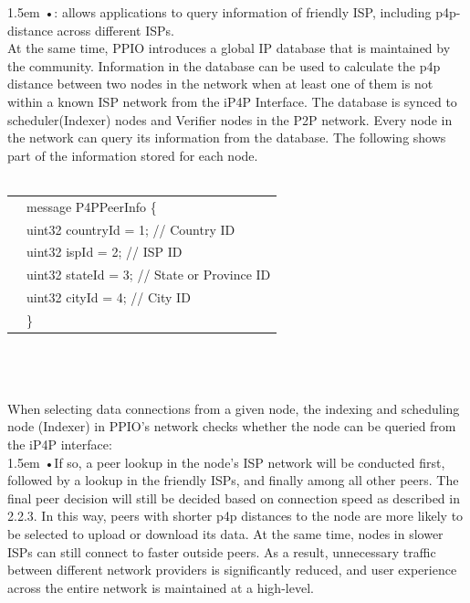 \documentclass[10pt,a4paper]{article}
\begin{document}
\hangindent 1.5em
\noindent   
•: allows applications to query information of friendly ISP, including p4p-distance across different ISPs.
\vspace{-0.6em}
\\

\noindent 
At the same time, PPIO introduces a global IP database that is maintained by the community. Information in the database can be used to calculate the p4p distance between two nodes in the network when at least one of them is not within a known ISP network from the iP4P Interface. The database is synced to scheduler(Indexer) nodes and Verifier nodes in the P2P network. Every node in the network can query its information from the database. The following shows part of the information stored for each node.\\\\
\begin{tabular}{r|l}
&message P4PPeerInfo   \{ \\
	&\qquad uint32 countryId = 1;   //  Country ID \\
	&\qquad uint32 ispId = 2;       //  ISP ID  \\ 
	&\qquad uint32 stateId = 3;     // State or  Province ID \\
	&\qquad uint32 cityId = 4;      // City ID  \\ 
	&\}   \\ 
	
\end{tabular} \\
  \vspace{-0.5em}
\\\\
\noindent 
When selecting data connections from a given node, the indexing and scheduling node (Indexer) in PPIO’s network checks whether the node can be queried from the iP4P interface:  
\vspace{-0.8em}
\\  

\hangindent 1.5em
\noindent   
•\quad If so, a peer lookup in the node’s ISP network will be conducted first, followed by a lookup in the friendly ISPs, and finally among all other peers. The final peer decision will still be decided based on connection speed as described in 2.2.3. In this way, peers with shorter p4p distances to the node are more likely to be selected to upload or download its data. At the same time, nodes in slower ISPs can still connect to faster outside peers. As a result, unnecessary traffic between different network providers is significantly reduced, and user experience across the entire network is maintained at a high-level.
\vspace{-0.8em}
\\
\end{document}
